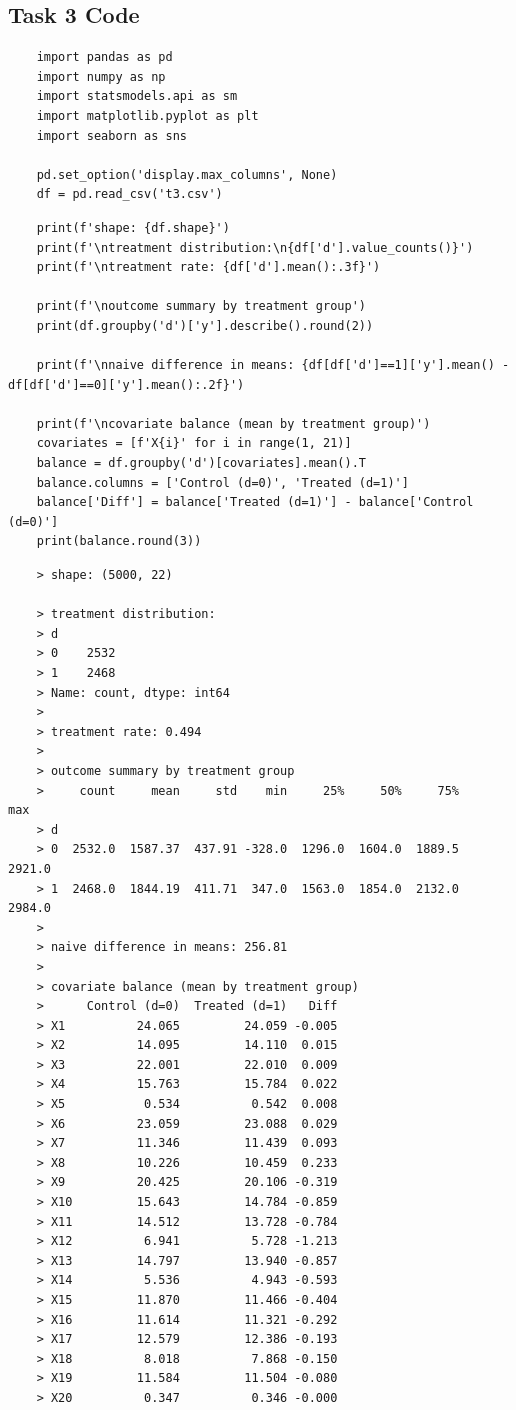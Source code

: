 \documentclass[10pt]{article}
\begin{document}
\subsection{Task 3 Code}
\label{app:task_three}
\begin{lstlisting}
    import pandas as pd 
    import numpy as np 
    import statsmodels.api as sm
    import matplotlib.pyplot as plt 
    import seaborn as sns 
    
    pd.set_option('display.max_columns', None)
    df = pd.read_csv('t3.csv')
\end{lstlisting}
\begin{lstlisting}
    print(f'shape: {df.shape}')
    print(f'\ntreatment distribution:\n{df['d'].value_counts()}')
    print(f'\ntreatment rate: {df['d'].mean():.3f}')

    print(f'\noutcome summary by treatment group')
    print(df.groupby('d')['y'].describe().round(2))

    print(f'\nnaive difference in means: {df[df['d']==1]['y'].mean() - df[df['d']==0]['y'].mean():.2f}')

    print(f'\ncovariate balance (mean by treatment group)')
    covariates = [f'X{i}' for i in range(1, 21)]
    balance = df.groupby('d')[covariates].mean().T
    balance.columns = ['Control (d=0)', 'Treated (d=1)']
    balance['Diff'] = balance['Treated (d=1)'] - balance['Control (d=0)']
    print(balance.round(3))
\end{lstlisting}
\begin{verbatim}
    > shape: (5000, 22)
    
    > treatment distribution:
    > d
    > 0    2532
    > 1    2468
    > Name: count, dtype: int64
    > 
    > treatment rate: 0.494
    > 
    > outcome summary by treatment group
    >     count     mean     std    min     25%     50%     75%     max
    > d                                                                
    > 0  2532.0  1587.37  437.91 -328.0  1296.0  1604.0  1889.5  2921.0
    > 1  2468.0  1844.19  411.71  347.0  1563.0  1854.0  2132.0  2984.0
    > 
    > naive difference in means: 256.81
    > 
    > covariate balance (mean by treatment group)
    >      Control (d=0)  Treated (d=1)   Diff
    > X1          24.065         24.059 -0.005
    > X2          14.095         14.110  0.015
    > X3          22.001         22.010  0.009
    > X4          15.763         15.784  0.022
    > X5           0.534          0.542  0.008
    > X6          23.059         23.088  0.029
    > X7          11.346         11.439  0.093
    > X8          10.226         10.459  0.233
    > X9          20.425         20.106 -0.319
    > X10         15.643         14.784 -0.859
    > X11         14.512         13.728 -0.784
    > X12          6.941          5.728 -1.213
    > X13         14.797         13.940 -0.857
    > X14          5.536          4.943 -0.593
    > X15         11.870         11.466 -0.404
    > X16         11.614         11.321 -0.292
    > X17         12.579         12.386 -0.193
    > X18          8.018          7.868 -0.150
    > X19         11.584         11.504 -0.080
    > X20          0.347          0.346 -0.000
\end{verbatim}
\end{document}
